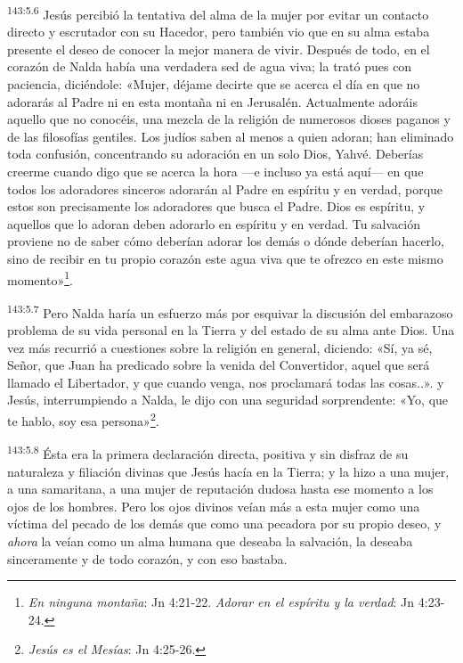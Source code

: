\par 
\textsuperscript{143:5.6} Jesús percibió la tentativa del alma de la mujer por evitar un contacto directo y escrutador con su Hacedor, pero también vio que en su alma estaba presente el deseo de conocer la mejor manera de vivir. Después de todo, en el corazón de Nalda había una verdadera sed de agua viva; la trató pues con paciencia, diciéndole: «Mujer, déjame decirte que se acerca el día en que no adorarás al Padre ni en esta montaña ni en Jerusalén. Actualmente adoráis aquello que no conocéis, una mezcla de la religión de numerosos dioses paganos y de las filosofías gentiles. Los judíos saben al menos a quien adoran; han eliminado toda confusión, concentrando su adoración en un solo Dios, Yahvé. Deberías creerme cuando digo que se acerca la hora ---e incluso ya está aquí--- en que todos los adoradores sinceros adorarán al Padre en espíritu y en verdad, porque estos son precisamente los adoradores que busca el Padre. Dios es espíritu, y aquellos que lo adoran deben adorarlo en espíritu y en verdad. Tu salvación proviene no de saber cómo deberían adorar los demás o dónde deberían hacerlo, sino de recibir en tu propio corazón este agua viva que te ofrezco en este mismo momento»\footnote{\textit{En ninguna montaña}: Jn 4:21-22. \textit{Adorar en el espíritu y la verdad}: Jn 4:23-24.}.

\par 
\textsuperscript{143:5.7} Pero Nalda haría un esfuerzo más por esquivar la discusión del embarazoso problema de su vida personal en la Tierra y del estado de su alma ante Dios. Una vez más recurrió a cuestiones sobre la religión en general, diciendo: «Sí, ya sé, Señor, que Juan ha predicado sobre la venida del Convertidor, aquel que será llamado el Libertador, y que cuando venga, nos proclamará todas las cosas..». y Jesús, interrumpiendo a Nalda, le dijo con una seguridad sorprendente: «Yo, que te hablo, soy esa persona»\footnote{\textit{Jesús es el Mesías}: Jn 4:25-26.}.

\par 
\textsuperscript{143:5.8} Ésta era la primera declaración directa, positiva y sin disfraz de su naturaleza y filiación divinas que Jesús hacía en la Tierra; y la hizo a una mujer, a una samaritana, a una mujer de reputación dudosa hasta ese momento a los ojos de los hombres. Pero los ojos divinos veían más a esta mujer como una víctima del pecado de los demás que como una pecadora por su propio deseo, y \textit{ahora} la veían como un alma humana que deseaba la salvación, la deseaba sinceramente y de todo corazón, y con eso bastaba.

